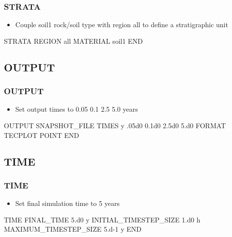 \documentclass{beamer}
\newcommand\greencomment[1]{{{\color{green} #1}}}
\newcommand\magentacomment[1]{{{\color{magenta} #1}}}
\begin{document}
\begin{frame}[fragile]\frametitle{STRATA}

\begin{itemize}
\item Couple \greencomment{soil1} rock/soil type with region \greencomment{all} to define a stratigraphic unit
\end{itemize}

\begin{semiverbatim}

STRATA
  REGION all
  MATERIAL soil1
END


\end{semiverbatim}

\end{frame}

\subsection{OUTPUT}

\begin{frame}[fragile]\frametitle{OUTPUT}

\begin{itemize}
\item Set output times to 0.05 0.1 2.5 5.0 years
\end{itemize}


\begin{semiverbatim}

OUTPUT
  SNAPSHOT_FILE
  \magentacomment{TIMES y  .05d0 0.1d0 2.5d0 5.d0}   
  FORMAT TECPLOT POINT            
END

\end{semiverbatim}

\end{frame}

\subsection{TIME}

\begin{frame}[fragile]\frametitle{TIME}

\begin{itemize}
\item Set final simulation time to 5 years
\end{itemize}

\begin{semiverbatim}

TIME
  FINAL_TIME \magentacomment{5.d0} y
  INITIAL_TIMESTEP_SIZE 1.d0 h
  MAXIMUM_TIMESTEP_SIZE 5.d-1 y
END

\end{semiverbatim}

\end{frame}
\end{document}
